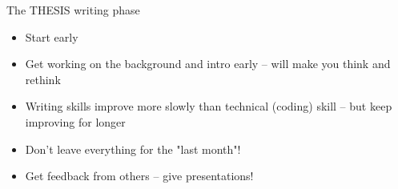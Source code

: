 \documentclass[xcolor=x11names,compress]{beamer}
\renewcommand{\(}{\begin{columns}}
\renewcommand{\)}{\end{columns}}
\newcommand{\<}[1]{\begin{column}{#1}}
\renewcommand{\>}{\end{column}}
\begin{document}
\begin{frame}{The THESIS writing phase}

  \begin{itemize}[<+->]\itemsep20pt
    \item Start early
    \item Get working on the background and intro early -- will make you think and rethink 
    \item Writing skills improve more slowly than technical (coding) skill -- but keep improving for longer
    \item Don't leave everything for the "last month"!
    \item Get feedback from others -- give presentations!
 \end{itemize}
 
\end{frame}

\end{document}
